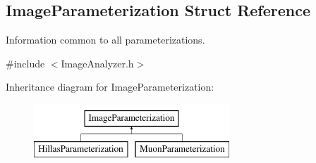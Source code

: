 \hypertarget{structImageParameterization}{
\subsection{ImageParameterization Struct Reference}
\label{structImageParameterization}
}


Information common to all parameterizations.  




{\ttfamily \#include $<$ImageAnalyzer.h$>$}

Inheritance diagram for ImageParameterization:\begin{figure}[H]
\begin{center}
\leavevmode
\includegraphics[height=2.000000cm]{structImageParameterization}
\end{center}
\end{figure}
